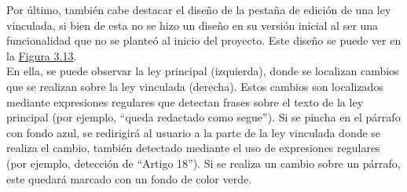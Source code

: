 Por último, también cabe destacar el diseño de la pestaña de edición de una ley vinculada, si bien de esta no se hizo un diseño en su versión inicial al ser una funcionalidad que no se planteó al inicio del proyecto. Este diseño se puede ver en la \hyperref[enlacePLeyVinculadaDiseno]{Figura 3.13}.
\\

En ella, se puede observar la ley principal (izquierda), donde se localizan cambios que se realizan sobre la ley vinculada (derecha). Estos cambios son localizados mediante expresiones regulares que detectan frases sobre el texto de la ley principal (por ejemplo, ``queda redactado como segue''). Si se pincha en el párrafo con fondo azul, se redirigirá al usuario a la parte de la ley vinculada donde se realiza el cambio, también detectado mediante el uso de expresiones regulares (por ejemplo, detección de ``Artigo 18''). Si se realiza un cambio sobre un párrafo, este quedará marcado con un fondo de color verde.